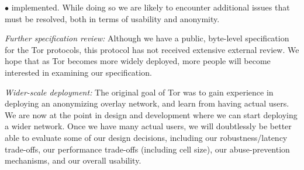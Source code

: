 \documentclass[times,10pt,twocolumn]{article}
\newenvironment{tightlist}{\begin{list}{$\bullet$}{
  \setlength{\itemsep}{0mm}
    \setlength{\parsep}{0mm}
    }}{\end{list}}
\begin{document}
\begin{tightlist}
  implemented.  While doing so we are likely to encounter additional
  issues that must be resolved, both in terms of usability and anonymity.
\item \emph{Further specification review:} Although we have a public,
  byte-level specification for the Tor protocols, this protocol has
  not received extensive external review.  We hope that as Tor
  becomes more widely deployed, more people will become interested in
  examining our specification.
\item \emph{Wider-scale deployment:} The original goal of Tor was to
  gain experience in deploying an anonymizing overlay network, and
  learn from having actual users.  We are now at the point in design
  and development where we can start deploying a wider network.  Once
  we have many actual users, we will doubtlessly be better
  able to evaluate some of our design decisions, including our
  robustness/latency trade-offs, our performance trade-offs (including
  cell size), our abuse-prevention mechanisms, and
  our overall usability.
\end{tightlist}






\end{document}
